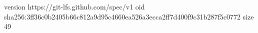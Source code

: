 version https://git-lfs.github.com/spec/v1
oid sha256:3ff36c0b2405b66c812a9d95c4660ea526a3ecca2ff7d400f9c31b287f5c0772
size 49
